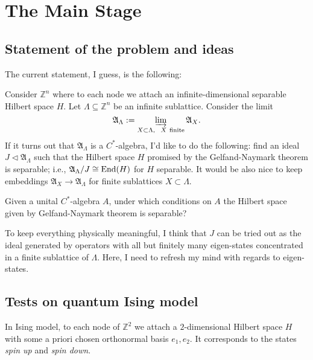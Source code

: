 \section{The Main Stage}
\subsection{Statement of the problem and ideas}
The current statement, I guess, is the following:

\begin{statement}
Consider $\mathbb Z^n$ where to each node we attach an infinite-dimensional separable Hilbert space $H$. Let $\Lambda \subseteq \mathbb Z^n$ be an infinite sublattice. Consider the limit
\[
\mathfrak A_{\Lambda} := \varinjlim_{X \subset \Lambda, \ \ X\ \text{finite}} \mathfrak A_{X}.
\]
If it turns out that $\mathfrak A_{\Lambda}$ is a $C^*$-algebra, I'd like to do the following: find an ideal $J \triangleleft \mathfrak A_{\Lambda}$ such that the Hilbert space $H$ promised by the Gelfand-Naymark theorem is separable; i.e., $\mathfrak A_{\Lambda}/J \cong \operatorname{End}(H)$ for $H$ separable. It would be also nice to keep embeddings $\mathfrak A_{X} \rightarrow \mathfrak A_{\Lambda}$ for finite sublattices $X \subset \Lambda$.
\end{statement}

\begin{fur}
Given a unital $C^*$-algebra $A$, under which conditions on $A$ the Hilbert space given by Gelfand-Naymark theorem is separable?
\end{fur}

\begin{idea}
To keep everything physically meaningful, I think that $J$ can be tried out as the ideal generated by operators with all but finitely many eigen-states concentrated in a finite sublattice of $\Lambda$. Here, I need to refresh my mind with regards to eigen-states.
\end{idea}

\subsection{Tests on quantum Ising model}
In Ising model, to each node of $\mathbb Z^2$ we attach a $2$-dimensional Hilbert space $H$ with some a priori chosen orthonormal basis $e_1,e_2$. It corresponds to the states \emph{spin up} and \emph{spin down}.
